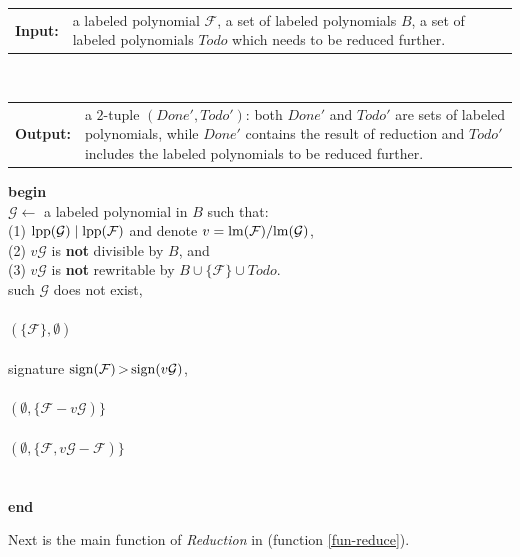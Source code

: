 \documentclass[preprint,authoryear,3p,12pt]{elsarticle}
\makeatletter
\newcommand{\Input}[1]
  {\noindent\begin{tabular}{@{}p{1.8cm}@{}p{13.2cm}@{}}
   {\bf Input: }&#1 \end{tabular}}
\newcommand{\Output}[1]
  {\noindent\begin{tabular}{@{}p{1.8cm}@{}p{13.2cm}@{}}
   {\bf Output: }&#1 \end{tabular}}
\def\lm{{\rm lm}}
\def\lpp{{\rm lpp}}
\def\sus{{\,>\,}}
\def\s{{\rm{sign}}}
\def\lif{{\bf if \,}}
\def\lthen{{\bf then \,}}
\def\lelse{{\bf else \,}}
\def\lendif{{\bf end if\,}}
\def\lend{{\bf end \,}}
\def\lreturn{{\bf return \,}}
\def\lla{{\longleftarrow}}
\def\lbegin{{\bf begin}}
\newcommand{\SPC}{\hspace*{15pt}}
\makeatother
\begin{document}
\begin{function} \caption{\bf --- TopReduction} \label{fun-topreduce}
  \smallskip
  \Input{a labeled polynomial ${\mathcal F}$, a set of labeled polynomials $B$, a set of labeled polynomials $Todo$ which needs to be reduced further. }\\
  \Output{a $2$-tuple $(Done', Todo')$: both $Done'$ and $Todo'$ are sets of labeled polynomials,
  while $Done'$ contains the result of reduction and $Todo'$
  includes the labeled polynomials to be reduced further.}
  \medskip

  \noindent
  \lbegin\\
  \SPC ${\mathcal G} \lla $ a labeled polynomial in $B$ such
  that: \\
  \SPC\SPC\SPC\SPC (1) $\lpp({\mathcal G}) \mid \lpp({\mathcal F})$ and denote $v=\lm({\mathcal F})/\lm({\mathcal
  G})$, \\
  \SPC\SPC\SPC\SPC (2) $v{\mathcal G}$ is {\bf not} divisible by
  $B$, and \\
  \SPC\SPC\SPC\SPC (3) $v{\mathcal G}$ is {\bf not} rewritable by
  $B \cup \{ {\mathcal F} \} \cup Todo$. \\
  \SPC  \lif such ${\mathcal G}$ does not exist, \\
  \SPC\SPC \lthen \\
  \SPC\SPC\SPC \lreturn $(\{{\mathcal F}\}, \emptyset)$\\
  \SPC\SPC \lelse \\
  \SPC\SPC\SPC \lif signature $\s({\mathcal F}) \sus \s(v{\mathcal
  G})$,\\
  \SPC\SPC\SPC\SPC \lthen \\
  \SPC\SPC\SPC\SPC\SPC \lreturn $(\emptyset, \{{\mathcal F}-v{\mathcal
  G})\}$\\
  \SPC\SPC\SPC\SPC \lelse \\
  \SPC\SPC\SPC\SPC\SPC \lreturn $(\emptyset, \{{\mathcal F}, v{\mathcal
  G}-{\mathcal F})\}$\\
  \SPC\SPC\SPC \lendif\\
  \SPC \lendif\\
  \lend
  \medskip
\end{function}




Next is the main function of {\em Reduction} in \citep{Fau02}
(function \ref{fun-reduce}).
\end{document}
